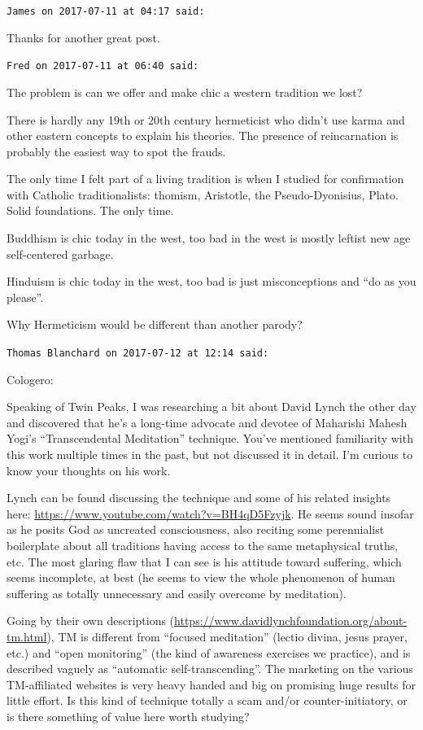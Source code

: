 \begin{footnotesize}
\begin{sffamily}
\texttt{James on 2017-07-11 at 04:17 said:}

Thanks for another great post.

\hfill

\texttt{Fred on 2017-07-11 at 06:40 said:}

The problem is can we offer and make chic a western tradition we lost?

There is hardly any 19th or 20th century hermeticist who didn't use karma and other eastern concepts to explain his theories. The presence of reincarnation is probably the easiest way to spot the frauds.

The only time I felt part of a living tradition is when I studied for confirmation with Catholic traditionalists: thomism, Aristotle, the Pseudo-Dyonisius, Plato. Solid foundations. The only time.

Buddhism is chic today in the west, too bad in the west is mostly leftist new age self-centered garbage.

Hinduism is chic today in the west, too bad is just misconceptions and ``do as you please''.

Why Hermeticism would be different than another parody?

\hfill

\texttt{Thomas Blanchard on 2017-07-12 at 12:14 said:}

Cologero:

Speaking of Twin Peaks, I was researching a bit about David Lynch the other day and discovered that he's a long-time advocate and devotee of Maharishi Mahesh Yogi's ``Transcendental Meditation'' technique. You've mentioned familiarity with this work multiple times in the past, but not discussed it in detail. I'm curious to know your thoughts on his work.

Lynch can be found discussing the technique and some of his related insights here: \url{https://www.youtube.com/watch?v=BH4qD5Fzyjk}. He seems sound insofar as he posits God as uncreated consciousness, also reciting some perennialist boilerplate about all traditions having access to the same metaphysical truths, etc. The most glaring flaw that I can see is his attitude toward suffering, which seems incomplete, at best (he seems to view the whole phenomenon of human suffering as totally unnecessary and easily overcome by meditation).

Going by their own descriptions (\url{https://www.davidlynchfoundation.org/about-tm.html}), TM is different from ``focused meditation'' (lectio divina, jesus prayer, etc.) and ``open monitoring'' (the kind of awareness exercises we practice), and is described vaguely as ``automatic self-transcending''. The marketing on the various TM-affiliated websites is very heavy handed and big on promising huge results for little effort. Is this kind of technique totally a scam and/or counter-initiatory, or is there something of value here worth studying?


\end{sffamily}
\end{footnotesize}
